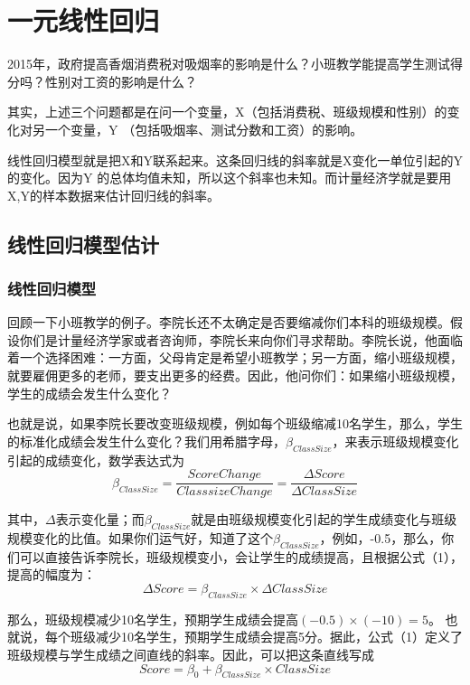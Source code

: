 \documentclass[cn,12pt,math=newtx,citestyle=gb7714-2015,bibstyle=gb7714-2015]{elegantbook}
\begin{document}
	
	
	\chapter{一元线性回归}
	
	2015年，政府提高香烟消费税对吸烟率的影响是什么？小班教学能提高学生测试得分吗？性别对工资的影响是什么？
	
	其实，上述三个问题都是在问一个变量，X（包括消费税、班级规模和性别）的变化对另一个变量，Y （包括吸烟率、测试分数和工资）的影响。
	
	线性回归模型就是把X和Y联系起来。这条回归线的斜率就是X变化一单位引起的Y的变化。因为Y 的总体均值未知，所以这个斜率也未知。而计量经济学就是要用X,Y的样本数据来估计回归线的斜率。
	\section{线性回归模型估计}
	\subsection{线性回归模型}
	回顾一下小班教学的例子。李院长还不太确定是否要缩减你们本科的班级规模。假设你们是计量经济学家或者咨询师，李院长来向你们寻求帮助。李院长说，他面临着一个选择困难：一方面，父母肯定是希望小班教学；另一方面，缩小班级规模，就要雇佣更多的老师，要支出更多的经费。因此，他问你们：如果缩小班级规模，学生的成绩会发生什么变化？
	
	也就是说，如果李院长要改变班级规模，例如每个班级缩减10名学生，那么，学生的标准化成绩会发生什么变化？我们用希腊字母，$\beta_{ClassSize}$，来表示班级规模变化引起的成绩变化，数学表达式为
	\begin{equation}
		\beta_{ClassSize}=\frac{Score Change}{Classsize Change}=\frac{\Delta{Score}}{\Delta{ClassSize}}
	\end{equation}
	
	其中，$\Delta$表示变化量；而$\beta_{ClassSize}$就是由班级规模变化引起的学生成绩变化与班级规模变化的比值。如果你们运气好，知道了这个$\beta_{ClassSize}$，例如，-0.5，那么，你们可以直接告诉李院长，班级规模变小，会让学生的成绩提高，且根据公式（1），提高的幅度为：
	\begin{equation}
		\Delta{Score}=\beta_{ClassSize}\times\Delta{ClassSize}
	\end{equation}
	
	那么，班级规模减少10名学生，预期学生成绩会提高$(-0.5)\times(-10)=5$。 也就说，每个班级减少10名学生，预期学生成绩会提高5分。据此，公式（1）定义了班级规模与学生成绩之间直线的斜率。因此，可以把这条直线写成
	\begin{equation}
		Score=\beta_0+\beta_{ClassSize}\times{ClassSize}
	\end{equation}
	
\end{document}
